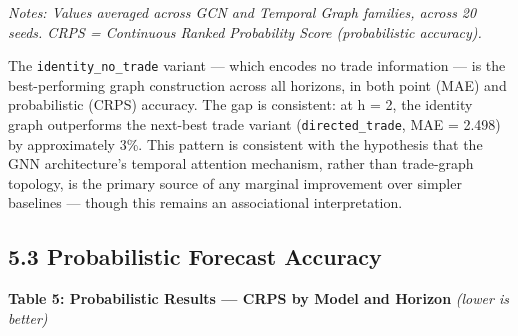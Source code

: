 \documentclass[
]{article}
\begin{document}
\emph{Notes: Values averaged across GCN and Temporal Graph families,
across 20 seeds. CRPS = Continuous Ranked Probability Score
(probabilistic accuracy).}

The \texttt{identity\_no\_trade} variant --- which encodes no trade
information --- is the best-performing graph construction across all
horizons, in both point (MAE) and probabilistic (CRPS) accuracy. The gap
is consistent: at h = 2, the identity graph outperforms the next-best
trade variant (\texttt{directed\_trade}, MAE = 2.498) by approximately
3\%. This pattern is consistent with the hypothesis that the GNN architecture's temporal
attention mechanism, rather than trade-graph topology, is the primary source of
any marginal improvement over simpler baselines --- though this remains an associational interpretation.

\subsection{5.3 Probabilistic Forecast
Accuracy}\label{probabilistic-forecast-accuracy}

\textbf{Table 5: Probabilistic Results --- CRPS by Model and Horizon}
\emph{(lower is better)}
\end{document}
